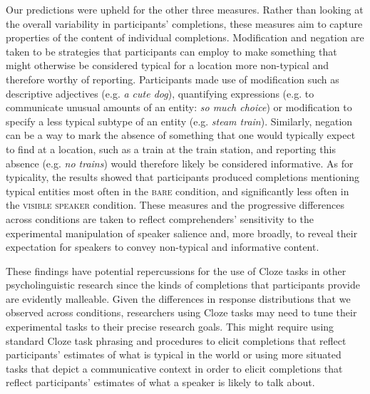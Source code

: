 \documentclass[output=paper,colorlinks,citecolor=brown]{langscibook}
\begin{document}
Our predictions were upheld for the other three measures. Rather than looking at the overall variability in participants’ completions, these measures aim to capture properties of the content of individual completions. Modification and negation are taken to be strategies that participants can employ to make something that might otherwise be considered typical for a location more non-typical and therefore worthy of reporting. Participants made use of modification such as descriptive adjectives (e.g. \textit{a cute dog}), quantifying expressions (e.g. to communicate unusual amounts of an entity: \textit{so much choice}) or modification to specify a less typical subtype of an entity (e.g. \textit{steam train}). Similarly, negation can be a way to mark the absence of something that one would typically expect to find at a location, such as a train at the train station, and reporting this absence (e.g. \textit{no trains}) would therefore likely be considered informative. As for typicality, the results showed that participants produced completions mentioning typical entities most often in the \textsc{bare} condition, and significantly less often in the \textsc{visible speaker} condition. These measures and the progressive differences across conditions are taken to reflect comprehenders’ sensitivity to the experimental manipulation of speaker salience and, more broadly, to reveal their expectation for speakers to convey non-typical and informative content.

These findings have potential repercussions for the use of Cloze tasks in other psycholinguistic research since the kinds of completions that participants provide are evidently malleable. Given the differences in response distributions that we observed across conditions, researchers using Cloze tasks may need to tune their experimental tasks to their precise research goals. This might require using standard Cloze task phrasing and procedures to elicit completions that reflect participants' estimates of what is typical in the world or using more situated tasks that depict a communicative context in order to elicit completions that reflect participants' estimates of what a speaker is likely to talk about.
\end{document}
